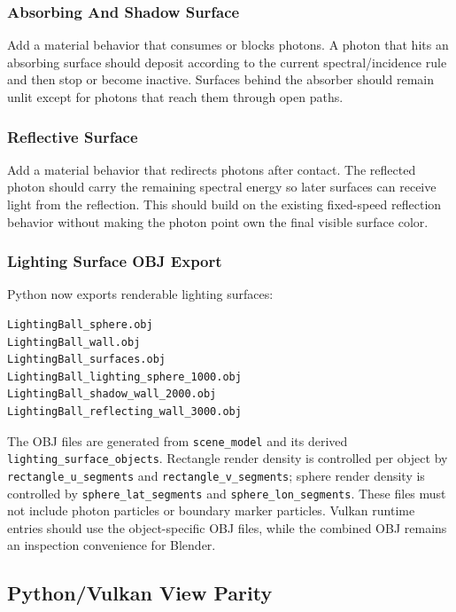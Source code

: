 \subsubsection{Absorbing And Shadow Surface}

Add a material behavior that consumes or blocks photons.  A photon that hits an
absorbing surface should deposit according to the current spectral/incidence
rule and then stop or become inactive.  Surfaces behind the absorber should
remain unlit except for photons that reach them through open paths.

\subsubsection{Reflective Surface}

Add a material behavior that redirects photons after contact.  The reflected
photon should carry the remaining spectral energy so later surfaces can receive
light from the reflection.  This should build on the existing fixed-speed
reflection behavior without making the photon point own the final visible
surface color.

\subsubsection{Lighting Surface OBJ Export}

Python now exports renderable lighting surfaces:
\begin{verbatim}
LightingBall_sphere.obj
LightingBall_wall.obj
LightingBall_surfaces.obj
LightingBall_lighting_sphere_1000.obj
LightingBall_shadow_wall_2000.obj
LightingBall_reflecting_wall_3000.obj
\end{verbatim}

The OBJ files are generated from \texttt{scene\_model} and its derived
\texttt{lighting\_surface\_objects}.  Rectangle render density is controlled
per object by \texttt{rectangle\_u\_segments} and
\texttt{rectangle\_v\_segments}; sphere render density is controlled by
\texttt{sphere\_lat\_segments} and \texttt{sphere\_lon\_segments}.  These
files must not include photon particles or boundary marker particles.  Vulkan
runtime entries should use the object-specific OBJ files, while the combined
OBJ remains an inspection convenience for Blender.

\subsection{Python/Vulkan View Parity}

